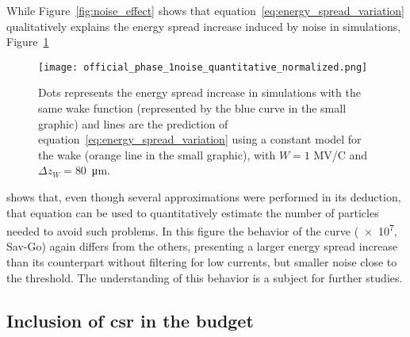     While Figure~\ref{fig:noise_effect} shows that equation~\eqref{eq:energy_spread_variation} qualitatively explains the energy spread increase induced by noise in simulations, Figure~\ref{fig:quantitative_noise_effect}
    \begin{figure}
        \centering
        \texttt{[image: official\_phase\_1noise\_quantitative\_normalized.png]}
        \caption[Application of equation~\eqref{eq:energy_spread_variation} to account for energy spread increase.]{Dots represents the energy spread increase in simulations with the same wake function (represented by the blue curve in the small graphic) and lines are the prediction of equation~\eqref{eq:energy_spread_variation} using a constant model for the wake (orange line in the small graphic), with $W=1$ MV/C and $\Delta z_W = $\SI{80}{\micro\meter}.}
        \label{fig:quantitative_noise_effect}
    \end{figure}
    shows that, even though several approximations were performed in its deduction, that equation can be used to quantitatively estimate the number of particles needed to avoid such problems. In this figure the behavior of the curve (\num{e7}, Sav-Go) again differs from the others, presenting a larger energy spread increase than its counterpart without filtering for low currents, but smaller noise close to the threshold. The understanding of this behavior is a subject for further studies.

\subsection{Inclusion of \gls{csr} in the budget}

